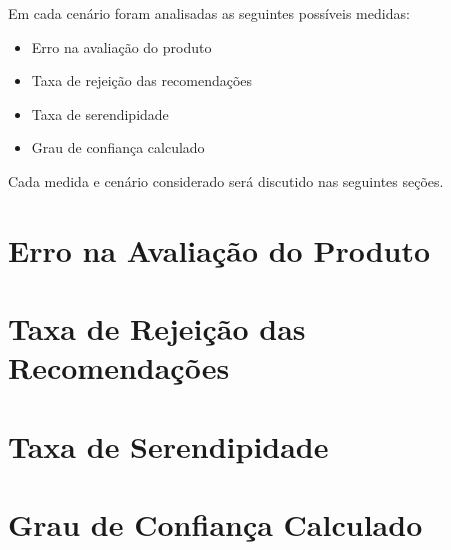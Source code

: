  Em cada cenário foram analisadas as seguintes possíveis medidas:
 
\begin{itemize}
	\item Erro na avaliação do produto
	\item Taxa de rejeição das recomendações
	\item Taxa de serendipidade
	\item Grau de confiança calculado
\end{itemize}

 Cada medida e cenário considerado será discutido nas seguintes seções.
 
\section{Erro na Avaliação do Produto}


\section{Taxa de Rejeição das Recomendações}


\section{Taxa de Serendipidade}


\section{Grau de Confiança Calculado}

